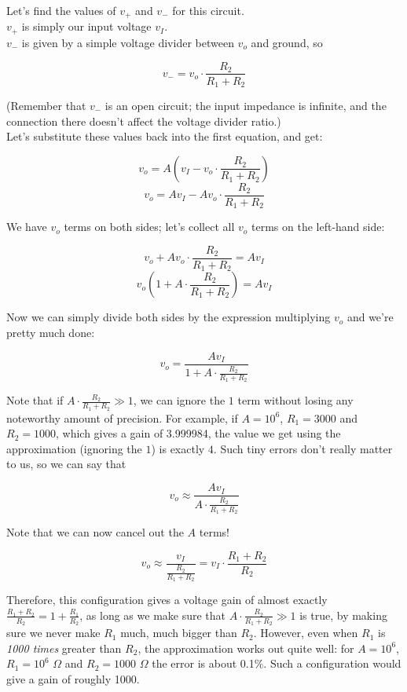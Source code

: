 \documentclass[12pt,a4paper]{report}
\begin{document}
Let's find the values of $v_+$ and $v_-$ for this circuit.\\
$v_+$ is simply our input voltage $v_I$.\\
$v_-$ is given by a simple voltage divider between $v_o$ and ground, so

\[ v_- = v_o \cdot \frac{R_2}{R_1 + R_2} \]

(Remember that $v_-$ is an open circuit; the input impedance is infinite, and the connection there doesn't affect the voltage divider ratio.)\\

Let's substitute these values back into the first equation, and get:

\[ v_o = A(v_I - v_o \cdot \frac{R_2}{R_1 + R_2}) \]
\[ v_o = Av_I - A v_o \cdot \frac{R_2}{R_1 + R_2} \]

We have $v_o$ terms on both sides; let's collect all $v_o$ terms on the left-hand side:

\[ v_o + A v_o \cdot \frac{R_2}{R_1 + R_2} = A v_I  \]
\[ v_o(1 + A \cdot \frac{R_2}{R_1 + R_2}) = A v_I \]

Now we can simply divide both sides by the expression multiplying $v_o$ and we're pretty much done:

\[ v_o = \frac{A v_I}{1 + A \cdot \frac{R_2}{R_1 + R_2}} \]

Note that if $\displaystyle A \cdot \frac{R_2}{R_1 + R_2} \gg 1$, we can ignore the $1$ term without losing any noteworthy amount of precision. For example, if $A = 10^6$, $R_1 = 3000$ and $R_2 = 1000$, which gives a gain of 3.999984, the value we get using the approximation (ignoring the $1$) is exactly $4$. Such tiny errors don't really matter to us, so we can say that

\[ v_o \approx \frac{A v_I}{A \cdot \frac{R_2}{R_1 + R_2}} \]

Note that we can now cancel out the $A$ terms!

\[ v_o \approx \frac{v_I}{\frac{R_2}{R_1 + R_2}} = v_I \cdot \frac{R_1 + R_2}{R_2} \]

Therefore, this configuration gives a voltage gain of almost exactly $\displaystyle \frac{R_1 + R_2}{R_2} = 1 + \frac{R_1}{R_2}$, as long as we make sure that $\displaystyle A \cdot \frac{R_2}{R_1 + R_2} \gg 1$ is true, by making sure we never make $R_1$ much, much bigger than $R_2$. However, even when $R_1$ is \emph{1000 times} greater than $R_2$, the approximation works out quite well: for $A = 10^6$, $R_1 = 10^6$ $\Omega$ and $R_2 = 1000$ $\Omega$ the error is about 0.1\%. Such a configuration would give a gain of roughly 1000.\\
\end{document}
